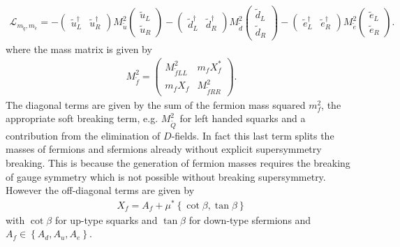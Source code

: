 \begin{align}
\mathcal{L}_{m_{\tilde{q}},m_{\tilde{e}}} = - \begin{pmatrix}
\tilde{u}^\dagger_L & \tilde{u}^\dagger_R 
\end{pmatrix} M^2_{\tilde{u}} \begin{pmatrix}
\tilde{u}_L \\
\tilde{u}_R 
\end{pmatrix} - \begin{pmatrix}
\tilde{d}^\dagger_L & \tilde{d}^\dagger_R 
\end{pmatrix} M^2_{\tilde{d}} \begin{pmatrix}
\tilde{d}_L \\
\tilde{d}_R 
\end{pmatrix} - \begin{pmatrix}
\tilde{e}^\dagger_L & \tilde{e}^\dagger_R 
\end{pmatrix} M^2_{\tilde{e}} \begin{pmatrix}
\tilde{e}_L \\
\tilde{e}_R 
\end{pmatrix}.
\end{align}
where the mass matrix is given by 
\begin{align}
M^2_{\tilde{f}} = \begin{pmatrix}
M^2_{\tilde{f}LL} & m_f X_f^\ast \\
m_f X_f &  M^2_{\tilde{f}RR}
\end{pmatrix}.
\end{align}
The diagonal terms are given by the sum of the fermion mass squared $m_f^2$, the appropriate soft breaking term, e.g. $M_{\tilde{Q}}^2$ for left handed squarks and a contribution from the elimination of $D$-fields. In fact this last term splits the masses of fermions and sfermions already without explicit supersymmetry breaking. This is because the generation of fermion masses requires the breaking of gauge symmetry which is not possible without breaking supersymmetry. However the off-diagonal terms are given by
\begin{align}
X_f = A_f + \mu^\ast\left\{ \cot \beta, \tan \beta \right\} \label{eq:off_diagonal}
\end{align}
with $\cot \beta$ for up-type squarks and $\tan \beta$ for down-type sfermions and $A_f \in \left\{ A_d, A_u, A_e \right\}$.

